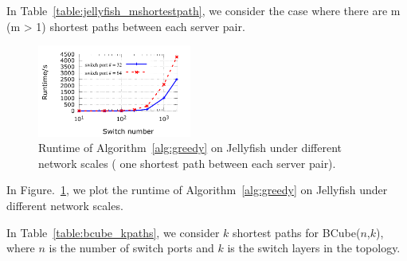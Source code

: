 In Table~\ref{table:jellyfish_mshortestpath}, we  consider the case where there are m (m > 1) shortest paths between each server pair.


\begin{figure}
	\centering
	\includegraphics[width=0.45\textwidth] {figs/algo_runtime}
	\caption{Runtime of Algorithm~\ref{alg:greedy} on Jellyfish under different network scales ( one shortest path between each server pair).}
	\label{fig:algo_runtime}
\end{figure}

In Figure.~\ref{fig:algo_runtime}, we  plot the runtime of Algorithm~\ref{alg:greedy} on Jellyfish under different network scales.

\begin{table}[t]
	\centering
	\caption{BCube with k shortest paths between every server pair.}
	\label{table:bcube_kpaths}
\end{table}

In Table~\ref{table:bcube_kpaths}, we consider $k$ shortest paths for BCube($n$,$k$), where $n$ is the number of switch ports and $k$ is the switch layers in the topology.

